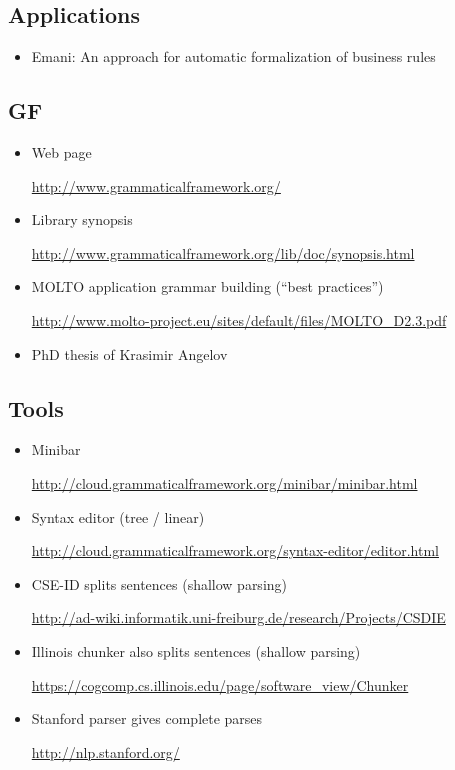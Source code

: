 \documentclass[]{article}
\providecommand{\tightlist}{%
  \setlength{\itemsep}{0pt}\setlength{\parskip}{0pt}}
\begin{document}
\subsection{Applications}\label{applications}

\begin{itemize}
\tightlist
\item
  Emani: An approach for automatic formalization of business rules
\end{itemize}

\subsection{GF}\label{gf}

\begin{itemize}
\item
  Web page

  \url{http://www.grammaticalframework.org/}
\item
  Library synopsis

  \url{http://www.grammaticalframework.org/lib/doc/synopsis.html}
\item
  MOLTO application grammar building (``best practices'')

  \url{http://www.molto-project.eu/sites/default/files/MOLTO_D2.3.pdf}
\item
  PhD thesis of Krasimir Angelov
\end{itemize}

\subsection{Tools}\label{tools}

\begin{itemize}
\item
  Minibar

  \url{http://cloud.grammaticalframework.org/minibar/minibar.html}
\item
  Syntax editor (tree / linear)

  \url{http://cloud.grammaticalframework.org/syntax-editor/editor.html}
\item
  CSE-ID splits sentences (shallow parsing)

  \url{http://ad-wiki.informatik.uni-freiburg.de/research/Projects/CSDIE}
\item
  Illinois chunker also splits sentences (shallow parsing)

  \url{https://cogcomp.cs.illinois.edu/page/software_view/Chunker}
\item
  Stanford parser gives complete parses

  \url{http://nlp.stanford.org/}
\end{itemize}
\end{document}
